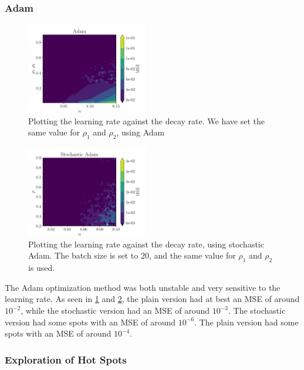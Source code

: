 \subsubsection{Adam}
\begin{figure}[h!]
    \centering
    \includegraphics[width = 0.475\textwidth]{../figs/Adam_eta_rho.pdf}
    \caption{Plotting the learning rate against the decay rate. We have set the same value for $\rho_1$ and $\rho_2$, using Adam}
    \label{fig: Adam_eta_rho.pdf}
\end{figure}
\begin{figure}[h!]
    \centering
    \includegraphics[width = 0.475\textwidth]{../figs/Adam_stochastic_eta_rho.pdf}
    \caption{Plotting the learning rate against the decay rate, using stochastic Adam. The batch size is set to 20, and the same value for $\rho_1$ and $\rho_2$ is used.}
    \label{fig: Adam_stochastic_eta_rho.pdf}
\end{figure}


The Adam optimization method was both unstable and very sensitive to the learning rate. As seen in \cref{fig: Adam_eta_rho.pdf} and \cref{fig: Adam_stochastic_eta_rho.pdf}, the plain version had at best an MSE of around \(10^{-2}\), while the stochastic version had an MSE of around \(10^{-3}\). The stochastic version had some spots with an MSE of around \(10^{-6}\). The plain version had some spots with an MSE of around \(10^{-4}\).

\clearpage



\subsubsection{Exploration of Hot Spots}


